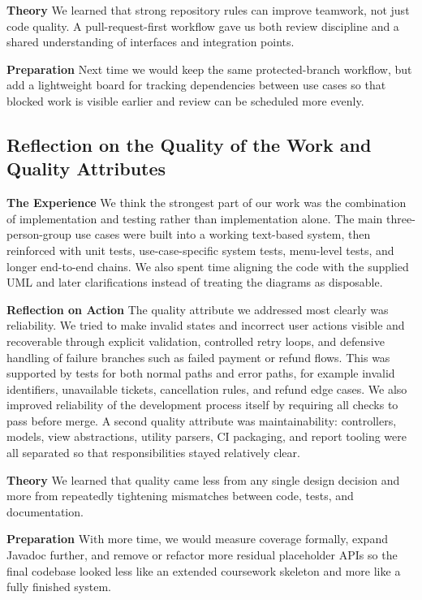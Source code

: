 \documentclass[11pt,a4paper]{article}
\begin{document}
\textbf{Theory}
We learned that strong repository rules can improve teamwork, not just code quality. A pull-request-first workflow gave us both review discipline and a shared understanding of interfaces and integration points.

\textbf{Preparation}
Next time we would keep the same protected-branch workflow, but add a lightweight board for tracking dependencies between use cases so that blocked work is visible earlier and review can be scheduled more evenly.

\subsection{Reflection on the Quality of the Work and Quality Attributes}

\noindent
\textbf{The Experience}
We think the strongest part of our work was the combination of implementation and testing rather than implementation alone. The main three-person-group use cases were built into a working text-based system, then reinforced with unit tests, use-case-specific system tests, menu-level tests, and longer end-to-end chains. We also spent time aligning the code with the supplied UML and later clarifications instead of treating the diagrams as disposable.

\textbf{Reflection on Action}
The quality attribute we addressed most clearly was reliability. We tried to make invalid states and incorrect user actions visible and recoverable through explicit validation, controlled retry loops, and defensive handling of failure branches such as failed payment or refund flows. This was supported by tests for both normal paths and error paths, for example invalid identifiers, unavailable tickets, cancellation rules, and refund edge cases. We also improved reliability of the development process itself by requiring all checks to pass before merge. A second quality attribute was maintainability: controllers, models, view abstractions, utility parsers, CI packaging, and report tooling were all separated so that responsibilities stayed relatively clear.

\newpage

\textbf{Theory}
We learned that quality came less from any single design decision and more from repeatedly tightening mismatches between code, tests, and documentation.

\textbf{Preparation}
With more time, we would measure coverage formally, expand Javadoc further, and remove or refactor more residual placeholder APIs so the final codebase looked less like an extended coursework skeleton and more like a fully finished system.
\end{document}
